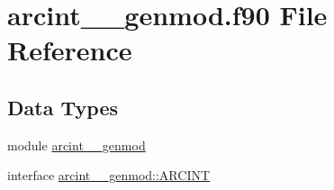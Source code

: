 \hypertarget{arcint____genmod_8f90}{\section{arcint\+\_\+\+\_\+genmod.\+f90 File Reference}
\label{arcint____genmod_8f90}
}
\subsection*{Data Types}
\begin{DoxyCompactItemize}
\item 
module \hyperlink{classarcint____genmod}{arcint\+\_\+\+\_\+genmod}
\item 
interface \hyperlink{interfacearcint____genmod_1_1ARCINT}{arcint\+\_\+\+\_\+genmod\+::\+A\+R\+C\+I\+N\+T}
\end{DoxyCompactItemize}
